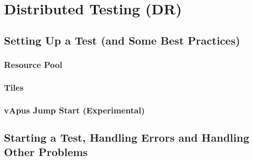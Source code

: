 \section{Distributed Testing (DR)}
\subsection{Setting Up a Test (and Some Best Practices)}
\subsubsection{Resource Pool}
\subsubsection{Tiles}
\subsubsection{vApus Jump Start (Experimental)}
\subsection{Starting a Test, Handling Errors and Handling Other Problems}